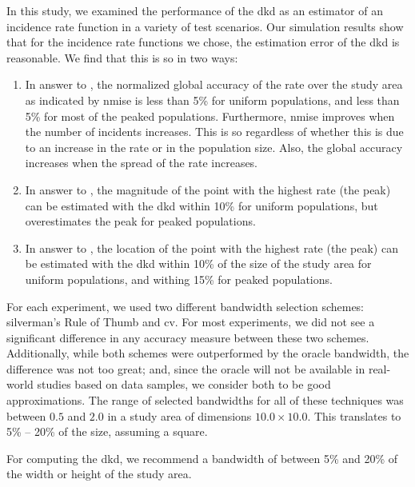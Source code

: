 


In this study,
we examined the performance of the \acrfull{dkd} as an estimator of an incidence rate function in a variety of test scenarios.
Our simulation results show that for the \gls{incidence rate} functions we chose,
the estimation error of the \gls{dkd} is reasonable.
We find that this is so in two ways:
\begin{enumerate}
    \item In answer to ,
    the normalized global accuracy
    of the rate over the study area as indicated by \gls{nmise}
    is less than 5\% for uniform populations,
    and less than 5\% for most of the peaked populations.
    Furthermore, \gls{nmise} improves when the number of incidents increases.
    This is so regardless of whether this is due to an increase in the rate or in the population size.
    Also, the global accuracy increases when the spread of the rate increases.
    \item In answer to ,
    the magnitude of the point with the highest rate (the peak) can be estimated with the \gls{dkd}
    within 10\% for uniform populations,
    but overestimates the peak for peaked populations.
    \item In answer to ,
    the location of the point with the highest rate (the peak) can be estimated with the \gls{dkd}
    within 10\% of the size of the study area for uniform populations,
    and withing 15\% for peaked populations.
\end{enumerate}

For each experiment,
we used two different bandwidth selection schemes:
\gls{silverman}'s Rule of Thumb and \acrfull{cv}.
For most experiments,
we did not see a significant difference in any accuracy measure between these two schemes.
Additionally,
while both schemes were outperformed by the \gls{oracle bandwidth},
the difference was not too great;
and, since the \gls{oracle} will not be available in real-world studies based on data samples,
we consider both to be good approximations.
The range of selected bandwidths for all of these techniques was between $0.5$ and $2.0$ in a study area of dimensions $10.0 \times 10.0$.
This translates to 5\% -- 20\% of the size, assuming a square.
\begin{rec}
    \label{rec:bandwidth}
    For computing the \gls{dkd}, we recommend a bandwidth of between 5\% and 20\% of the width or height of the study area.
\end{rec}

